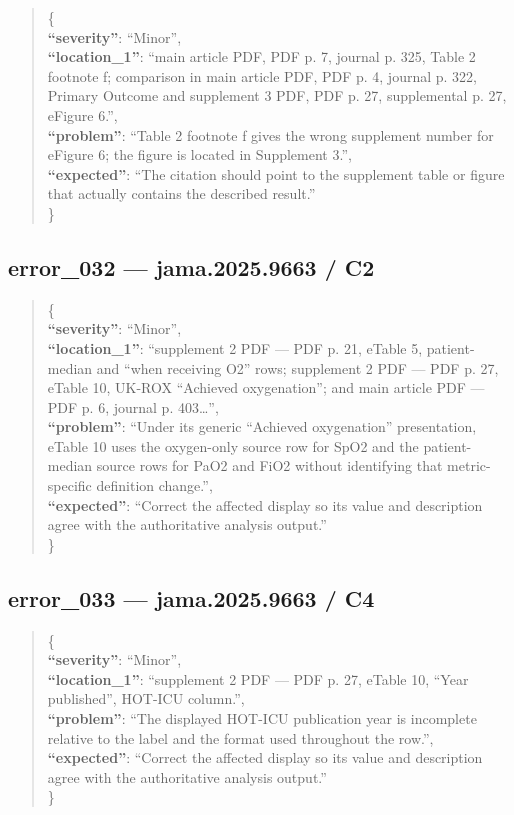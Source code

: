 \documentclass[
  letterpaper,
  9pt]{extreport}
\begin{document}
\begin{quote}
\{\\
\textbf{``severity''}: ``Minor'',\\
\textbf{``location\_1''}: ``main article PDF, PDF p. 7, journal p. 325,
Table 2 footnote f; comparison in main article PDF, PDF p. 4, journal p.
322, Primary Outcome and supplement 3 PDF, PDF p. 27, supplemental p.
27, eFigure 6.'',\\
\textbf{``problem''}: ``Table 2 footnote f gives the wrong supplement
number for eFigure 6; the figure is located in Supplement 3.'',\\
\textbf{``expected''}: ``The citation should point to the supplement
table or figure that actually contains the described result.''\\
\}
\end{quote}

\hypertarget{error_032--jama20259663--c2}{%
\subsection{error\_032 --- jama.2025.9663 /
C2}\label{error_032--jama20259663--c2}}

\begin{quote}
\{\\
\textbf{``severity''}: ``Minor'',\\
\textbf{``location\_1''}: ``supplement 2 PDF --- PDF p. 21, eTable 5,
patient-median and ``when receiving O2'' rows; supplement 2 PDF --- PDF
p. 27, eTable 10, UK-ROX ``Achieved oxygenation''; and main article PDF
--- PDF p. 6, journal p. 403\ldots{}'',\\
\textbf{``problem''}: ``Under its generic ``Achieved oxygenation''
presentation, eTable 10 uses the oxygen-only source row for SpO2 and the
patient-median source rows for PaO2 and FiO2 without identifying that
metric-specific definition change.'',\\
\textbf{``expected''}: ``Correct the affected display so its value and
description agree with the authoritative analysis output.''\\
\}
\end{quote}

\hypertarget{error_033--jama20259663--c4}{%
\subsection{error\_033 --- jama.2025.9663 /
C4}\label{error_033--jama20259663--c4}}

\begin{quote}
\{\\
\textbf{``severity''}: ``Minor'',\\
\textbf{``location\_1''}: ``supplement 2 PDF --- PDF p. 27, eTable 10,
``Year published'', HOT-ICU column.'',\\
\textbf{``problem''}: ``The displayed HOT-ICU publication year is
incomplete relative to the label and the format used throughout the
row.'',\\
\textbf{``expected''}: ``Correct the affected display so its value and
description agree with the authoritative analysis output.''\\
\}
\end{quote}
\end{document}

